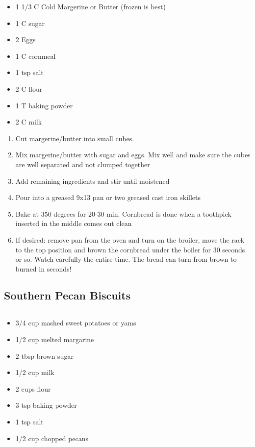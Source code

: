 \documentclass{article}
\begin{document}
\begin{framed}
    \begin{itemize}
        \item 1 1/3 C Cold Margerine or Butter (frozen is best)
        \item 1 C sugar
        \item 2 Eggs
        \item 1 C cornmeal
        \item 1 tsp salt
        \item 2 C flour
        \item 1 T baking powder
        \item 2 C milk
    \end{itemize}
\end{framed}


\begin{enumerate}
    \item 
        Cut margerine/butter into small cubes.
    \item 
        Mix margerine/butter with sugar and eggs. Mix well and make sure the cubes are well separated and not clumped together
    \item 
        Add remaining ingredients and stir until moistened
    \item 
        Pour into a greased 9x13 pan or two greased cast iron skillets
    \item 
        Bake at 350 degrees for 20-30 min. Cornbread is done when a toothpick inserted in the middle comes out clean
    \item 
        If desired: remove pan from the oven and turn on the broiler, move the rack to the top position and brown the cornbread under the boiler for 30 seconds or so.  Watch carefully the entire time.  The bread can turn from brown to burned in seconds!
\end{enumerate}
\newpage

\subsection{Southern Pecan Biscuits} 
\noindent\rule[0.5ex]{\linewidth}{1pt}

\begin{framed}
\begin{itemize}
    \item 3/4 cup mashed sweet potatoes or yams
    \item 1/2 cup melted margarine
    \item 2 tbsp brown sugar
    \item 1/2 cup milk
    \item 2 cups flour
    \item 3 tsp baking powder
    \item 1 tsp salt
    \item 1/2 cup chopped pecans
\end{itemize}
\end{framed}
\end{document}
